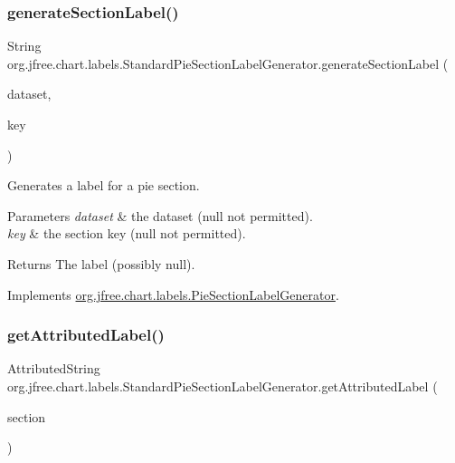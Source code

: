 \subsubsection{\texorpdfstring{generate\+Section\+Label()}{generateSectionLabel()}}
{\footnotesize\ttfamily String org.\+jfree.\+chart.\+labels.\+Standard\+Pie\+Section\+Label\+Generator.\+generate\+Section\+Label (\begin{DoxyParamCaption}\item[{\mbox{\hyperlink{interfaceorg_1_1jfree_1_1data_1_1general_1_1_pie_dataset}{Pie\+Dataset}}}]{dataset,  }\item[{Comparable}]{key }\end{DoxyParamCaption})}

Generates a label for a pie section.


\begin{DoxyParams}{Parameters}
{\em dataset} & the dataset ({\ttfamily null} not permitted). \\
\hline
{\em key} & the section key ({\ttfamily null} not permitted).\\
\hline
\end{DoxyParams}
\begin{DoxyReturn}{Returns}
The label (possibly {\ttfamily null}). 
\end{DoxyReturn}


Implements \mbox{\hyperlink{interfaceorg_1_1jfree_1_1chart_1_1labels_1_1_pie_section_label_generator_a9c514ffcd269a3d73720c1ed588c624f}{org.\+jfree.\+chart.\+labels.\+Pie\+Section\+Label\+Generator}}.

\mbox{\label{classorg_1_1jfree_1_1chart_1_1labels_1_1_standard_pie_section_label_generator_ad53325d20bd03f6c19cb2dec97b36b29}} 
\subsubsection{\texorpdfstring{get\+Attributed\+Label()}{getAttributedLabel()}}
{\footnotesize\ttfamily Attributed\+String org.\+jfree.\+chart.\+labels.\+Standard\+Pie\+Section\+Label\+Generator.\+get\+Attributed\+Label (\begin{DoxyParamCaption}\item[{int}]{section }\end{DoxyParamCaption})}

